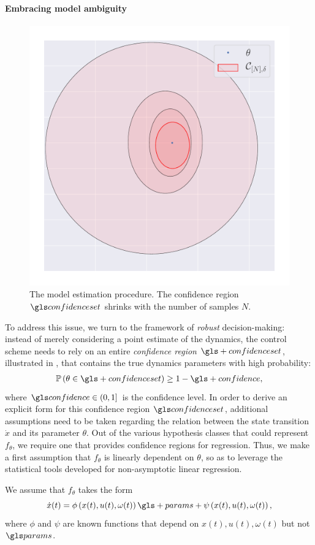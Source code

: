 \paragraph{Embracing model ambiguity}
\begin{figure}[ht]
	\centering
	\includegraphics[trim={1cm 0 0 0}, clip, width=0.5\linewidth]{img/ellipsoid}
	\caption{The model estimation procedure. The confidence region $\confidenceset$ shrinks with the number of samples $N$.}
	\label{fig:estimation}
\end{figure}
To address this issue, we turn to the framework of \emph{robust} decision-making: instead of merely considering a point estimate of the dynamics, the control scheme needs to rely on an entire \emph{confidence region} $\gls+{confidenceset}$, illustrated in , that contains the true dynamics parameters with high probability:
\begin{align}
\probability{\theta\in \gls+{confidenceset}} \geq 1-\gls+{confidence},
\label{eq:confidence}
\end{align}
where $\confidence\in(0,1]$ is the confidence level. 
In order to derive an explicit form for this confidence region $\confidenceset$, additional assumptions need to be taken regarding the relation between the state transition $\dot{x}$ and its parameter $\theta$. Out of the various hypothesis classes that could represent $f_\theta$, we require one that provides confidence regions for regression. Thus, we make a first assumption that $f_\theta$ is linearly dependent on $\theta$, so as to leverage the statistical tools developed for non-asymptotic linear regression.

\begin{assumption}
	\begin{leftbar}[assumptionbar]
	We assume that $f_\theta$ takes the form
	\begin{equation*}
	\dot{x}(t) = \phi\left(x(t),u(t),\omega(t)\right)\gls+{params} + \psi\left(x(t),u(t),\omega(t)\right),
	\end{equation*}
	where $\phi$ and $\psi$ are known functions that depend on $x(t),u(t),\omega(t)$ but not $\params$.
	\end{leftbar}
\end{assumption}

